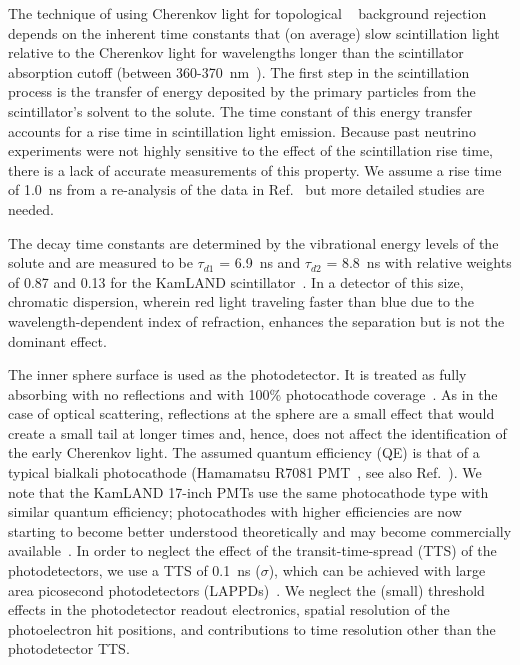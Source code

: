 The technique of using Cherenkov light for topological \B~ background rejection
depends on the inherent time constants that (on average) slow
scintillation light relative to the Cherenkov light for wavelengths
longer than the scintillator absorption cutoff (between
360-370~nm~\cite{scint_cutoff}). The first step in the scintillation
process is the transfer of energy deposited by the primary
particles from the scintillator's solvent to the solute. The time
constant of this energy transfer accounts for a rise time in
scintillation light emission. Because past neutrino experiments were
not highly sensitive to the effect of the scintillation rise time,
there is a lack of accurate measurements of this property. We assume a
rise time of 1.0~ns from a re-analysis of the data in
Ref.~\cite{ChristophThesis} but more detailed studies are needed. 

The decay time constants are determined by the vibrational energy
levels of the solute and are measured to be $\tau_{d1}$ = 6.9~ns and
$\tau_{d2}$ = 8.8~ns with relative weights of 0.87 and 0.13 for the
KamLAND scintillator~\cite{tajimaThesis}. In a detector of this size,
chromatic dispersion, wherein red light traveling faster than blue due to the
wavelength-dependent index of refraction, enhances the separation but
is not the dominant effect.

The inner sphere surface is used as the photodetector. It is treated
as fully absorbing with no reflections and with 100\% photocathode
coverage~\cite{Juno_coverage}. As in the case of optical scattering,
reflections at the sphere are a small effect that would create a small
tail at longer times and, hence, does not affect the identification of the
early Cherenkov light. The assumed quantum efficiency (QE) is that
of a typical bialkali photocathode (Hamamatsu R7081
PMT~\cite{Hamamatsu_R7081}, see also Ref.~\cite{dctwo}). 
We note that the KamLAND 17-inch PMTs use the same photocathode type with similar
quantum efficiency; photocathodes with higher efficiencies are now
starting to become better understood theoretically and may become
commercially available~\cite{Photonis, Smedley, Cultrera}.  In order to
neglect the effect of the transit-time-spread (TTS) of the
photodetectors, we use a TTS of 0.1~ns ($\sigma$), which can be
achieved with large area picosecond photodetectors
(LAPPDs)~\cite{anode_paper,PSEC4_paper,RSI_paper,Vienna2013,Ceramic_paper1,HV_paper,Timing_paper,Incom_paper}.
We neglect the (small) threshold effects in the photodetector readout
electronics, spatial resolution of the photoelectron hit positions,
and contributions to time resolution other than the photodetector TTS.

